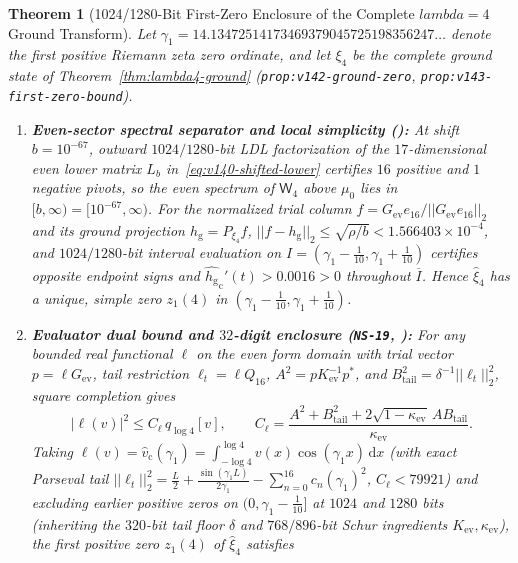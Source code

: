 \documentclass[11pt]{article}
\def\lambda{lambda}%
\def\norm#1{||#1||}%
\newtheorem{theorem}{Theorem}[section]
\theoremstyle{remark}
\newcommand{\norm}[1]{\left\lVert #1\right\rVert}
\newcommand{\dd}{\mathrm d}
\begin{document}
\begin{theorem}[1024/1280-Bit First-Zero Enclosure of the Complete $\lambda = 4$ Ground Transform]
\label{thm:first-zero-enclosure}
Let $\gamma_1 = 14.13472514173469379045725198356247\dots$ denote the first positive Riemann zeta zero ordinate, and let $\xi_4$ be the complete ground state of Theorem~\ref{thm:lambda4-ground} (\texttt{prop:v142-ground-zero}, \texttt{prop:v143-first-zero-bound}).
\begin{enumerate}[label=(\alph*)]
  \item \textbf{Even-sector spectral separator and local simplicity ():} At shift $b = 10^{-67}$, outward $1024/1280$-bit LDL factorization of the $17$-dimensional even lower matrix $L_b$ in~\eqref{eq:v140-shifted-lower} certifies $16$ positive and $1$ negative pivots, so the even spectrum of $\mathsf{W}_4$ above $\mu_0$ lies in $[b, \infty) = [10^{-67}, \infty)$. For the normalized trial column $f = G_{\mathrm{ev}}e_{16}/\norm{G_{\mathrm{ev}}e_{16}}_2$ and its ground projection $h_{\mathrm{g}} = P_{\xi_4}f$, $\norm{f - h_{\mathrm{g}}}_2 \le \sqrt{\rho/b} < 1.566403 \times 10^{-4}$, and $1024/1280$-bit interval evaluation on $I = (\gamma_1 - \tfrac{1}{10}, \gamma_1 + \tfrac{1}{10})$ certifies opposite endpoint signs and $\widehat{h_{\mathrm{g}}}_{\mathrm{c}}'(t) > 0.0016 > 0$ throughout $\overline{I}$. Hence $\widehat{\xi}_4$ has a unique, simple zero $z_1(4)$ in $(\gamma_1 - \tfrac{1}{10}, \gamma_1 + \tfrac{1}{10})$.
  \item \textbf{Evaluator dual bound and $32$-digit enclosure (\texttt{NS-19}, ):} For any bounded real functional $\ell$ on the even form domain with trial vector $p = \ell G_{\mathrm{ev}}$, tail restriction $\ell_t = \ell Q_{16}$, $A^2 = p K_{\mathrm{ev}}^{-1} p^*$, and $B_{\mathrm{tail}}^2 = \delta^{-1}\norm{\ell_t}_2^2$, square completion gives
  \begin{equation}\label{eq:v143-dual-bound}
    |\ell(v)|^2 \le C_\ell\, q_{\log 4}[v], \qquad C_\ell = \frac{A^2 + B_{\mathrm{tail}}^2 + 2\sqrt{1 - \kappa_{\mathrm{ev}}}\,AB_{\mathrm{tail}}}{\kappa_{\mathrm{ev}}}.
  \end{equation}
  Taking $\ell(v) = \widehat{v}_{\mathrm{c}}(\gamma_1) = \int_{-\log 4}^{\log 4} v(x)\cos(\gamma_1 x)\,\dd x$ (with exact Parseval tail $\norm{\ell_t}_2^2 = \frac{L}{2} + \frac{\sin(\gamma_1 L)}{2\gamma_1} - \sum_{n=0}^{16} c_n(\gamma_1)^2$, $C_\ell < 79921$) and excluding earlier positive zeros on $(0, \gamma_1 - \tfrac{1}{10}]$ at $1024$ and $1280$ bits (inheriting the $320$-bit tail floor $\delta$ and $768/896$-bit Schur ingredients $K_{\mathrm{ev}}, \kappa_{\mathrm{ev}}$), the first positive zero $z_1(4)$ of $\widehat{\xi}_4$ satisfies

\end{enumerate}
\end{theorem}
\end{document}
